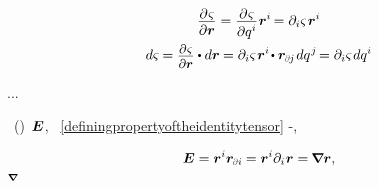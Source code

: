 \nopagebreak\vspace{-0.2em}
\begin{equation}\label{spatialdifferentialofsomething}
\begin{gathered}
\displaystyle\frac{\raisebox{-0.2em}{$\partial \hspace{.1ex} \varsigma$}}{\partial \locationvector}
=
\displaystyle\frac{\raisebox{-0.2em}{$\partial \hspace{.1ex} \varsigma$}}{\raisebox{-0.1em}{$\partial q^i$}} \hspace{.1ex} \locationvector^i \hspace{-0.25ex}
=
\partial_i \varsigma \hspace{.2ex} \locationvector^i
\\
%
d \varsigma \hspace{-0.1ex}
=
\scalebox{.9}{$ \displaystyle\frac{\raisebox{-0.2em}{$\partial \hspace{.1ex} \varsigma$}}{\partial \locationvector} $} \dotp d\locationvector \hspace{-0.1ex}
=
\partial_i \varsigma \hspace{.2ex} \locationvector^i \hspace{-0.3ex} \dotp \locationvector_\differentialindex{\hspace{-0.1ex}j} \hspace{.2ex} dq^{\hspace{.12ex}j} \hspace{-0.3ex}
=
\partial_i \varsigma \hspace{.2ex} dq^i
\end{gathered}
\end{equation}

...

~()~${\hspace{-0.1ex}\bm{E}}$,
~\eqref{definingpropertyoftheidentitytensor}
\dotproductinquotes\hbox{-},

\nopagebreak\vspace{-0.1em}\begin{equation}
\UnitDyad
= \locationvector^i \locationvector_\differentialindex{i} \hspace{-0.1ex}
= \tikzmark{beginOriginOfNabla} \locationvector^i \partial_i \tikzmark{endOriginOfNabla} \hspace{.1ex} \locationvector = \hspace{-0.16ex} \boldnabla \locationvector ,
\end{equation}
%
{${\scriptstyle \bm{\nabla}\hspace{-0.2ex}}$}

